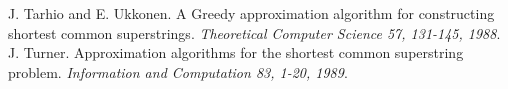 \documentclass[12pt]{article}
\theoremstyle{plain}
\begin{document}
\def\refname{Bibliografia}
\begin{thebibliography}{2}
J. Tarhio and E. Ukkonen. A Greedy approximation algorithm for constructing shortest common superstrings. \textit{Theoretical Computer Science 57, 131-145, 1988}.
J. Turner. Approximation algorithms for the shortest common superstring problem. \textit{Information and Computation 83, 1-20, 1989}.
\end{thebibliography}
\end{document}
